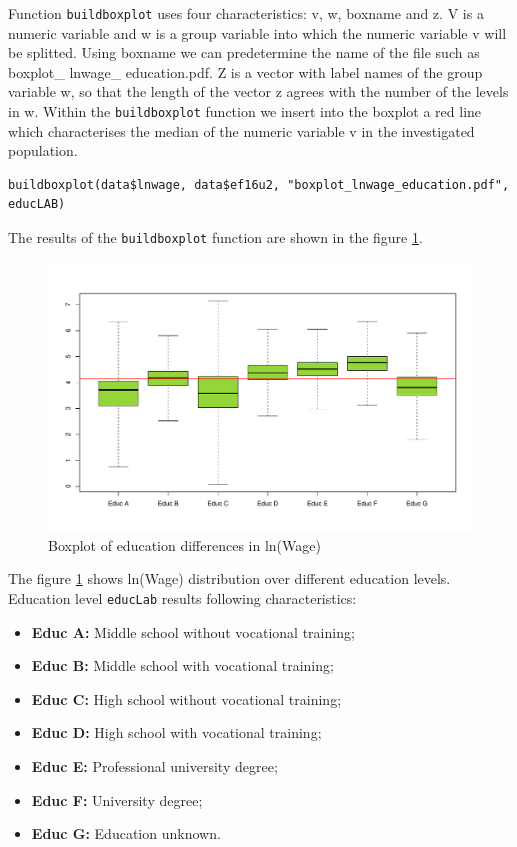 Function \texttt{buildboxplot} uses four characteristics: v, w, boxname and z. V is a numeric variable and w is a group variable into which the numeric variable v will be splitted. Using boxname we can predetermine the name of the file such as \glqq boxplot\_ lnwage\_ education.pdf\grqq{}. Z is a vector with label names of the group variable w, so that the length of the vector z agrees with the number of the levels in w. Within the \texttt{buildboxplot} function we insert into the boxplot a red line which characterises the median of the numeric variable v in the investigated population.
\lstset{firstnumber = 240}
\begin{lstlisting}
buildboxplot(data$lnwage, data$ef16u2, "boxplot_lnwage_education.pdf", educLAB)
\end{lstlisting}
The results of the \texttt{buildboxplot} function are shown in the figure \ref{Fig:boxplot}.
\begin{figure}
\begin{center}
\caption{Boxplot of education differences in ln(Wage)}
\label{Fig:boxplot}
\includegraphics[scale=0.55]{boxplot_lnwage_educ}
\end{center}
\end{figure}
The figure \ref{Fig:boxplot} shows ln(Wage) distribution over different education levels. Education level \texttt{educLab} results following characteristics:
\begin{itemize}
\setlength\itemsep{0em}
\item \textbf{Educ A:} Middle school without vocational training;
\item \textbf{Educ B:} Middle school with vocational training;
\item \textbf{Educ C:} High school without vocational training;
\item \textbf{Educ D:} High school with vocational training;
\item \textbf{Educ E:} Professional university degree;
\item \textbf{Educ F:} University degree;
\item \textbf{Educ G:} Education unknown.
\end{itemize}
